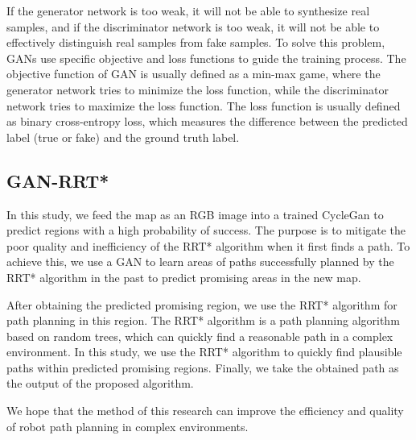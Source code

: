 \documentclass[smallcondensed]{svjour3}     %
\begin{document}
If the generator network is too weak, it will not be able to synthesize real samples, and if the discriminator network is too weak, it will not be able to effectively distinguish real samples from fake samples. 
To solve this problem, GANs use specific objective and loss functions to guide the training process.
The objective function of GAN is usually defined as a min-max game, where the generator network tries to minimize the loss function, while the discriminator network tries to maximize the loss function.
The loss function is usually defined as binary cross-entropy loss, which measures the difference between the predicted label (true or fake) and the ground truth label.


\subsection{GAN-RRT*}
In this study, we feed the map as an RGB image into a trained CycleGan to predict regions with a high probability of success. 
The purpose is to mitigate the poor quality and inefficiency of the RRT* algorithm when it first finds a path. 
To achieve this, we use a GAN to learn areas of paths successfully planned by the RRT* algorithm in the past to predict promising areas in the new map.

After obtaining the predicted promising region, we use the RRT* algorithm for path planning in this region.
The RRT* algorithm is a path planning algorithm based on random trees, which can quickly find a reasonable path in a complex environment. 
In this study, we use the RRT* algorithm to quickly find plausible paths within predicted promising regions. 
Finally, we take the obtained path as the output of the proposed algorithm.

We hope that the method of this research can improve the efficiency and quality of robot path planning in complex environments.
\end{document}

